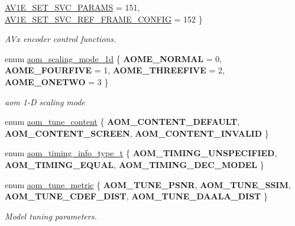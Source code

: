 \begin{DoxyCompactItemize}
\hyperlink{group__aom__encoder_ggae78dde67a6d78f332e9bdba0dde42db5a94c12c49cd70d86651136ec37230d719}{A\+V1\+E\+\_\+\+S\+E\+T\+\_\+\+S\+V\+C\+\_\+\+P\+A\+R\+A\+MS} = 151, 
\hyperlink{group__aom__encoder_ggae78dde67a6d78f332e9bdba0dde42db5a24a2e10051709d0684d8b7acfbf988c9}{A\+V1\+E\+\_\+\+S\+E\+T\+\_\+\+S\+V\+C\+\_\+\+R\+E\+F\+\_\+\+F\+R\+A\+M\+E\+\_\+\+C\+O\+N\+F\+IG} = 152
 \}\begin{DoxyCompactList}\small\item\em A\+Vx encoder control functions. \end{DoxyCompactList}
\item 
enum \hyperlink{group__aom__encoder_ga2a1791d26fca39303154f0f9ece3e295}{aom\+\_\+scaling\+\_\+mode\+\_\+1d} \{ {\bfseries A\+O\+M\+E\+\_\+\+N\+O\+R\+M\+AL} = 0, 
{\bfseries A\+O\+M\+E\+\_\+\+F\+O\+U\+R\+F\+I\+VE} = 1, 
{\bfseries A\+O\+M\+E\+\_\+\+T\+H\+R\+E\+E\+F\+I\+VE} = 2, 
{\bfseries A\+O\+M\+E\+\_\+\+O\+N\+E\+T\+WO} = 3
 \}\begin{DoxyCompactList}\small\item\em aom 1-\/D scaling mode \end{DoxyCompactList}
\item 
enum \hyperlink{group__aom__encoder_ga801f5eb2cb93da19a2f347ae7a44166a}{aom\+\_\+tune\+\_\+content} \{ {\bfseries A\+O\+M\+\_\+\+C\+O\+N\+T\+E\+N\+T\+\_\+\+D\+E\+F\+A\+U\+LT}, 
{\bfseries A\+O\+M\+\_\+\+C\+O\+N\+T\+E\+N\+T\+\_\+\+S\+C\+R\+E\+EN}, 
{\bfseries A\+O\+M\+\_\+\+C\+O\+N\+T\+E\+N\+T\+\_\+\+I\+N\+V\+A\+L\+ID}
 \}
\item 
enum \hyperlink{group__aom__encoder_gad69c1d6aa10530991eeb1a3f0a818cba}{aom\+\_\+timing\+\_\+info\+\_\+type\+\_\+t} \{ {\bfseries A\+O\+M\+\_\+\+T\+I\+M\+I\+N\+G\+\_\+\+U\+N\+S\+P\+E\+C\+I\+F\+I\+ED}, 
{\bfseries A\+O\+M\+\_\+\+T\+I\+M\+I\+N\+G\+\_\+\+E\+Q\+U\+AL}, 
{\bfseries A\+O\+M\+\_\+\+T\+I\+M\+I\+N\+G\+\_\+\+D\+E\+C\+\_\+\+M\+O\+D\+EL}
 \}
\item 
enum \hyperlink{group__aom__encoder_gaafd352cc596fab5388558950f8bbe739}{aom\+\_\+tune\+\_\+metric} \{ {\bfseries A\+O\+M\+\_\+\+T\+U\+N\+E\+\_\+\+P\+S\+NR}, 
{\bfseries A\+O\+M\+\_\+\+T\+U\+N\+E\+\_\+\+S\+S\+IM}, 
{\bfseries A\+O\+M\+\_\+\+T\+U\+N\+E\+\_\+\+C\+D\+E\+F\+\_\+\+D\+I\+ST}, 
{\bfseries A\+O\+M\+\_\+\+T\+U\+N\+E\+\_\+\+D\+A\+A\+L\+A\+\_\+\+D\+I\+ST}
 \}\begin{DoxyCompactList}\small\item\em Model tuning parameters. \end{DoxyCompactList}
\end{DoxyCompactItemize}
